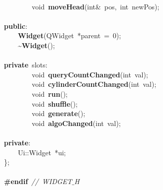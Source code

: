 \mbox{} \\
\mbox{}\ \ \ \ \ \ \ \ void\ \textbf{moveHead}(int\&\ pos,\ int\ newPos); \\
\mbox{} \\
\mbox{}\textbf{public}: \\
\mbox{}\ \ \ \ \textbf{Widget}(QWidget\ *parent\ =\ 0); \\
\mbox{}\ \ \ \ \textasciitilde{}\textbf{Widget}(); \\
\mbox{} \\
\mbox{}\textbf{private}\ slots: \\
\mbox{}\ \ \ \ \ \ \ \ void\ \textbf{queryCountChanged}(int\ val); \\
\mbox{}\ \ \ \ \ \ \ \ void\ \textbf{cylinderCountChanged}(int\ val); \\
\mbox{}\ \ \ \ \ \ \ \ void\ \textbf{run}(); \\
\mbox{}\ \ \ \ \ \ \ \ void\ \textbf{shuffle}(); \\
\mbox{}\ \ \ \ \ \ \ \ void\ \textbf{generate}(); \\
\mbox{}\ \ \ \ \ \ \ \ void\ \textbf{algoChanged}(int\ val); \\
\mbox{} \\
\mbox{}\textbf{private}: \\
\mbox{}\ \ \ \ Ui::Widget\ *ui; \\
\mbox{}\}; \\
\mbox{} \\
\mbox{}\textbf{\#endif}\ \textit{//\ WIDGET$\_$H} \\
\mbox{}
